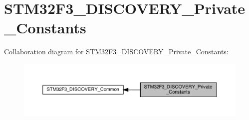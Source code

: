 \hypertarget{group__STM32F3__DISCOVERY__Private__Constants}{}\section{S\+T\+M32\+F3\+\_\+\+D\+I\+S\+C\+O\+V\+E\+R\+Y\+\_\+\+Private\+\_\+\+Constants}
\label{group__STM32F3__DISCOVERY__Private__Constants}
Collaboration diagram for S\+T\+M32\+F3\+\_\+\+D\+I\+S\+C\+O\+V\+E\+R\+Y\+\_\+\+Private\+\_\+\+Constants\+:\nopagebreak
\begin{figure}[H]
\begin{center}
\leavevmode
\includegraphics[width=350pt]{group__STM32F3__DISCOVERY__Private__Constants}
\end{center}
\end{figure}

